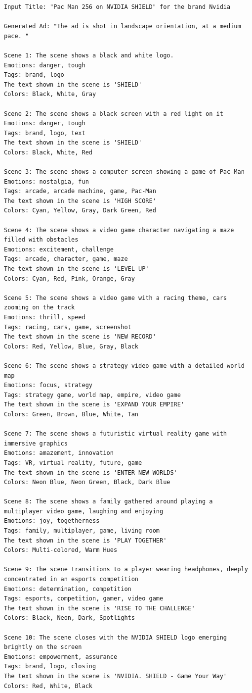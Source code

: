 \begin{lstlisting}[caption={Advertisement generated by Henry-SEED for an NVIDIA ad. Original Ad: \url{https://www.youtube.com/watch?v=HnaOhOJ6AcM}},frame=single,breaklines=true,basicstyle=\tiny,label={lst:nvidia}]
Input Title: "Pac Man 256 on NVIDIA SHIELD" for the brand Nvidia

Generated Ad: "The ad is shot in landscape orientation, at a medium pace. "

Scene 1: The scene shows a black and white logo.
Emotions: danger, tough
Tags: brand, logo
The text shown in the scene is 'SHIELD'
Colors: Black, White, Gray

Scene 2: The scene shows a black screen with a red light on it
Emotions: danger, tough
Tags: brand, logo, text
The text shown in the scene is 'SHIELD'
Colors: Black, White, Red

Scene 3: The scene shows a computer screen showing a game of Pac-Man
Emotions: nostalgia, fun
Tags: arcade, arcade machine, game, Pac-Man
The text shown in the scene is 'HIGH SCORE'
Colors: Cyan, Yellow, Gray, Dark Green, Red

Scene 4: The scene shows a video game character navigating a maze filled with obstacles
Emotions: excitement, challenge
Tags: arcade, character, game, maze
The text shown in the scene is 'LEVEL UP'
Colors: Cyan, Red, Pink, Orange, Gray

Scene 5: The scene shows a video game with a racing theme, cars zooming on the track
Emotions: thrill, speed
Tags: racing, cars, game, screenshot
The text shown in the scene is 'NEW RECORD'
Colors: Red, Yellow, Blue, Gray, Black

Scene 6: The scene shows a strategy video game with a detailed world map
Emotions: focus, strategy
Tags: strategy game, world map, empire, video game
The text shown in the scene is 'EXPAND YOUR EMPIRE'
Colors: Green, Brown, Blue, White, Tan

Scene 7: The scene shows a futuristic virtual reality game with immersive graphics
Emotions: amazement, innovation
Tags: VR, virtual reality, future, game
The text shown in the scene is 'ENTER NEW WORLDS'
Colors: Neon Blue, Neon Green, Black, Dark Blue

Scene 8: The scene shows a family gathered around playing a multiplayer video game, laughing and enjoying
Emotions: joy, togetherness
Tags: family, multiplayer, game, living room
The text shown in the scene is 'PLAY TOGETHER'
Colors: Multi-colored, Warm Hues

Scene 9: The scene transitions to a player wearing headphones, deeply concentrated in an esports competition
Emotions: determination, competition
Tags: esports, competition, gamer, video game
The text shown in the scene is 'RISE TO THE CHALLENGE'
Colors: Black, Neon, Dark, Spotlights

Scene 10: The scene closes with the NVIDIA SHIELD logo emerging brightly on the screen
Emotions: empowerment, assurance
Tags: brand, logo, closing
The text shown in the scene is 'NVIDIA. SHIELD - Game Your Way'
Colors: Red, White, Black
\end{lstlisting}

